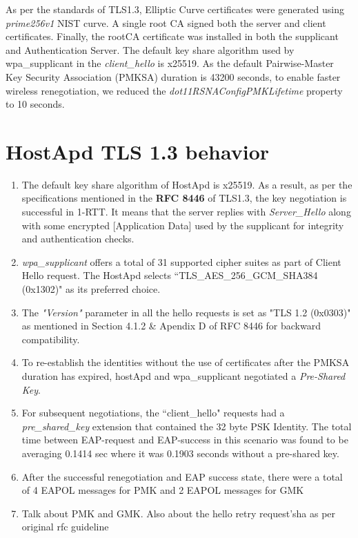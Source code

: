 \documentclass[12pt]{article}
\begin{document}
As per the standards of TLS1.3, Elliptic Curve certificates were generated using \emph{prime256v1} NIST curve. A single root CA signed both the server and client certificates. Finally, the rootCA certificate was installed in both the supplicant and Authentication Server. The default key share algorithm used by wpa\_supplicant in the \emph{client\_hello} is x25519. As the default Pairwise-Master Key Security Association (PMKSA) duration is 43200 seconds, to enable faster wireless renegotiation, we reduced the \emph{dot11RSNAConfigPMKLifetime} property to 10 seconds.  

\section{HostApd TLS 1.3 behavior}

\begin{enumerate}
	\item{The default key share algorithm of HostApd is x25519. As a result, as per the specifications mentioned in the \textbf{RFC 8446} of TLS1.3, the key negotiation is successful in 1-RTT. It means that the server replies with \emph{Server\_Hello} along with some encrypted [Application Data] used by the supplicant for integrity and authentication checks.}
	\item{\emph{wpa\_supplicant} offers a total of 31 supported cipher suites as part of Client Hello request. The HostApd selects ``TLS\_AES\_256\_GCM\_SHA384 (0x1302)" as its preferred choice. 
	  }
	\item{The \emph{"Version"} parameter in all the hello requests is set as "TLS 1.2 (0x0303)" as mentioned in Section 4.1.2 \& Apendix D of RFC 8446 for backward compatibility.}
	\item{To re-establish the identities without the use of certificates after the PMKSA duration has expired, hostApd and wpa\_supplicant negotiated a \emph{Pre-Shared Key}.}
	\item{For subsequent negotiations, the ``client\_hello" requests had a \emph{pre\_shared\_key} extension that contained the 32 byte PSK Identity. The total time between EAP-request and EAP-success in this scenario was found to be averaging 0.1414 sec where it was 0.1903 seconds without a pre-shared key.  }
	\item{After the successful renegotiation and EAP success state, there were a total of 4 EAPOL messages for PMK and 2 EAPOL messages for GMK}
	\item{Talk about PMK and GMK. Also about the hello retry request'sha as per original rfc guideline }
	
\end{enumerate}
\end{document}
